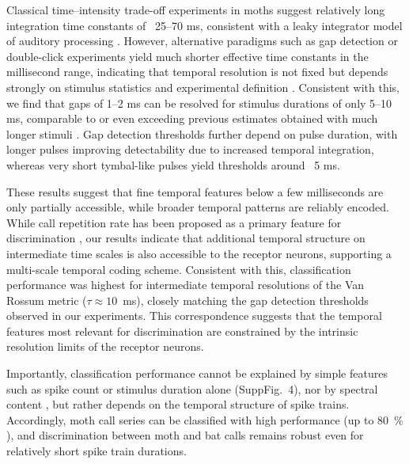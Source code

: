 \documentclass[12pt,a4paper]{article}
\newcommand{\percent}[1]{#1~$\%$}
\begin{document}
Classical time–intensity trade-off experiments in moths suggest relatively long integration time constants of ~25–70 ms, consistent with a leaky integrator model of auditory processing \parencite{surlykke_temporal_1988, waters_peripheral_1996}. However, alternative paradigms such as gap detection or double-click experiments yield much shorter effective time constants in the millisecond range, indicating that temporal resolution is not fixed but depends strongly on stimulus statistics and experimental definition \parencite{tougaard_detection_1998, waters_bats_2003}. Consistent with this, we find that gaps of 1–2 ms can be resolved for stimulus durations of only 5–10 ms, comparable to or even exceeding previous estimates obtained with much longer stimuli \parencite{surlykke_temporal_1988}. Gap detection thresholds further depend on pulse duration, with longer pulses improving detectability due to increased temporal integration, whereas very short tymbal-like pulses yield thresholds around ~5 ms. 

These results suggest that fine temporal features below a few milliseconds are only partially accessible, while broader temporal patterns are reliably encoded. While call repetition rate has been proposed as a primary feature for discrimination \parencite{sanderford_courtship_1998}, our results indicate that additional temporal structure on intermediate time scales is also accessible to the receptor neurons, supporting a multi-scale temporal coding scheme. Consistent with this, classification performance was highest for intermediate temporal resolutions of the Van Rossum metric ($\tau \approx 10$~ms), closely matching the gap detection thresholds observed in our experiments. This correspondence suggests that the temporal features most relevant for discrimination are constrained by the intrinsic resolution limits of the receptor neurons.

Importantly, classification performance cannot be explained by simple features such as spike count or stimulus duration alone (SuppFig.~4), nor by spectral content \parencite{waters_bats_2003}, but rather depends on the temporal structure of spike trains. Accordingly, moth call series can be classified with high performance (up to \percent{80}), and discrimination between moth and bat calls remains robust even for relatively short spike train durations.
\end{document}
